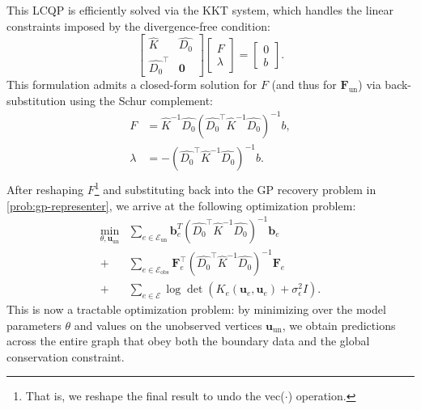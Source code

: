 \documentclass{article}
\theoremstyle{definition}
\theoremstyle{remark}
\begin{document}
This LCQP is efficiently solved via the KKT system, which handles the linear constraints imposed by the divergence-free condition:
\begin{equation}
	\begin{bmatrix} \widehat{K} & \widehat{D_0} \\ \widehat{D_0}^\intercal & \mathbf{0} \end{bmatrix} \begin{bmatrix} F \\ \lambda \end{bmatrix} = \begin{bmatrix} 0 \\ b \end{bmatrix}.
\end{equation}
This formulation admits a closed-form solution for $F$ (and thus for $\mathbf{F}_\text{un}$) via back-substitution using the Schur complement:
\begin{equation}\begin{split}
	F &=  \widehat{K}^{-1} \widehat{D_0} \left( \widehat{D_0}^\intercal \widehat{K}^{-1} \widehat{D_0} \right)^{-1} b, \\
	\lambda &= - (\widehat{D_0}^\intercal \widehat{K}^{-1} \widehat{D_0})^{-1} b. \\
\end{split}\end{equation}
After reshaping $F$\footnote{That is, we reshape the final result to undo the vec($\cdot$) operation.} and substituting back into the GP recovery problem in \eqref{prob:gp-representer}, we arrive at the following optimization problem:
\begin{equation} \begin{split}
	\min_{\theta, \mathbf{u}_\text{un}} 
     & \sum_{e \in \mathcal{E}_\text{un}}  \mathbf{b}_e^T\left(\widehat{D_0}^\intercal \widehat{K}^{-1} \widehat{D_0}\right)^{-1} \mathbf{b}_e\\
	+ & \sum_{e \in \mathcal{E}_\text{obs}} \mathbf{F}_e^\intercal \left(\widehat{D_0}^\intercal \widehat{K}^{-1} \widehat{D_0}\right)^{-1} \mathbf{F}_e \\
	+ & \sum_{e \in \mathcal{E}} \log \det \left( K_e( \mathbf{u}_e,  \mathbf{u}_e) + \sigma_{\epsilon}^2 I \right).\label{eq:optimization_final}
\end{split} \end{equation}
This is now a tractable optimization problem: by minimizing over the model parameters $\theta$ and values on the unobserved vertices $\mathbf{u}_\text{un}$, we obtain predictions across the entire graph that obey both the boundary data and the global conservation constraint.
\end{document}
